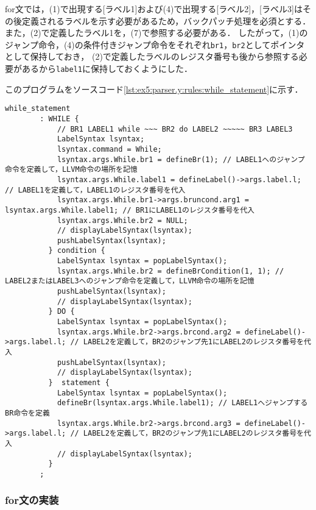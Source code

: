 \documentclass[uplatex]{jsarticle}
\begin{document}
for文では，(1)で出現する[ラベル1]および(4)で出現する[ラベル2]，[ラベル3]はその後定義されるラベルを示す必要があるため，バックパッチ処理を必須とする．
また，(2)で定義したラベル1を，(7)で参照する必要がある．
したがって，(1)のジャンプ命令，(4)の条件付きジャンプ命令をそれぞれ\verb#br1#，\verb#br2#としてポインタとして保持しておき，
(2)で定義したラベルのレジスタ番号も後から参照する必要があるから\verb#label1#に保持しておくようにした．

このプログラムをソースコード\ref{lst:ex5:parser.y:rules:while_statement}に示す．
\begin{lstlisting}[caption=while文の処理,label=lst:ex5:parser.y:rules:while_statement]
while_statement
        : WHILE {
            // BR1 LABEL1 while ~~~ BR2 do LABEL2 ~~~~~ BR3 LABEL3
            LabelSyntax lsyntax;
            lsyntax.command = While;
            lsyntax.args.While.br1 = defineBr(1); // LABEL1へのジャンプ命令を定義して，LLVM命令の場所を記憶
            lsyntax.args.While.label1 = defineLabel()->args.label.l; // LABEL1を定義して，LABEL1のレジスタ番号を代入
            lsyntax.args.While.br1->args.bruncond.arg1 = lsyntax.args.While.label1; // BR1にLABEL1のレジスタ番号を代入
            lsyntax.args.While.br2 = NULL;
            // displayLabelSyntax(lsyntax);
            pushLabelSyntax(lsyntax);
          } condition {
            LabelSyntax lsyntax = popLabelSyntax();
            lsyntax.args.While.br2 = defineBrCondition(1, 1); // LABEL2またはLABEL3へのジャンプ命令を定義して，LLVM命令の場所を記憶
            pushLabelSyntax(lsyntax);
            // displayLabelSyntax(lsyntax);
          } DO {
            LabelSyntax lsyntax = popLabelSyntax();
            lsyntax.args.While.br2->args.brcond.arg2 = defineLabel()->args.label.l; // LABEL2を定義して，BR2のジャンプ先1にLABEL2のレジスタ番号を代入
            pushLabelSyntax(lsyntax);
            // displayLabelSyntax(lsyntax);
          }  statement {
            LabelSyntax lsyntax = popLabelSyntax();
            defineBr(lsyntax.args.While.label1); // LABEL1へジャンプするBR命令を定義
            lsyntax.args.While.br2->args.brcond.arg3 = defineLabel()->args.label.l; // LABEL2を定義して，BR2のジャンプ先1にLABEL2のレジスタ番号を代入
            // displayLabelSyntax(lsyntax);
          }
        ;
\end{lstlisting}
\subsubsection{for文の実装}
\end{document}
